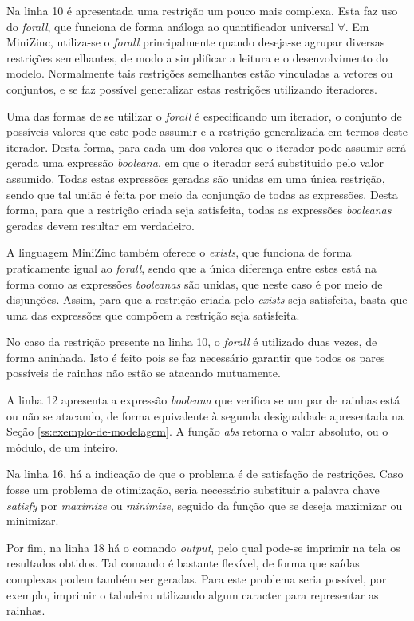 Na linha 10 é apresentada uma restrição um pouco mais complexa. Esta faz uso do \textit{forall}, que funciona de forma análoga ao quantificador universal $\forall$. Em MiniZinc, utiliza-se o \textit{forall} principalmente quando deseja-se agrupar diversas restrições semelhantes, de modo a simplificar a leitura e o desenvolvimento do modelo. Normalmente tais restrições semelhantes estão vinculadas a vetores ou conjuntos, e se faz possível generalizar estas restrições utilizando iteradores.

Uma das formas de se utilizar o \textit{forall} é especificando um iterador, o conjunto de possíveis valores que este pode assumir e a restrição generalizada em termos deste iterador. Desta forma, para cada um dos valores que o iterador pode assumir será gerada uma expressão \textit{booleana}, em que o iterador será substituido pelo valor assumido. Todas estas expressões geradas são unidas em uma única restrição, sendo que tal união é feita por meio da conjunção de todas as expressões. Desta forma, para que a restrição criada seja satisfeita, todas as expressões \textit{booleanas} geradas devem resultar em verdadeiro.

A linguagem MiniZinc também oferece o \textit{exists}, que funciona de forma praticamente igual ao \textit{forall}, sendo que a única diferença entre estes está na forma como as expressões \textit{booleanas} são unidas, que neste caso é por meio de disjunções. Assim, para que a restrição criada pelo \textit{exists} seja satisfeita, basta que uma das expressões que compõem a restrição seja satisfeita.

No caso da restrição presente na linha 10, o \textit{forall} é utilizado duas vezes, de forma aninhada. Isto é feito pois se faz necessário garantir que todos os pares possíveis de rainhas não estão se atacando mutuamente.

A linha 12 apresenta a expressão \textit{booleana} que verifica se um par de rainhas está ou não se atacando, de forma equivalente à segunda desigualdade apresentada na Seção \ref{ss:exemplo-de-modelagem}. A função \textit{abs} retorna o valor absoluto, ou o módulo, de um inteiro.

Na linha 16, há a indicação de que o problema é de satisfação de restrições. Caso fosse um problema de otimização, seria necessário substituir a palavra chave \textit{satisfy} por \textit{maximize} ou \textit{minimize}, seguido da função que se deseja maximizar ou minimizar.

Por fim, na linha 18 há o comando \textit{output}, pelo qual pode-se imprimir na tela os resultados obtidos. Tal comando é bastante flexível, de forma que saídas complexas podem também ser geradas. Para este problema seria possível, por exemplo, imprimir o tabuleiro utilizando algum caracter para representar as rainhas.

